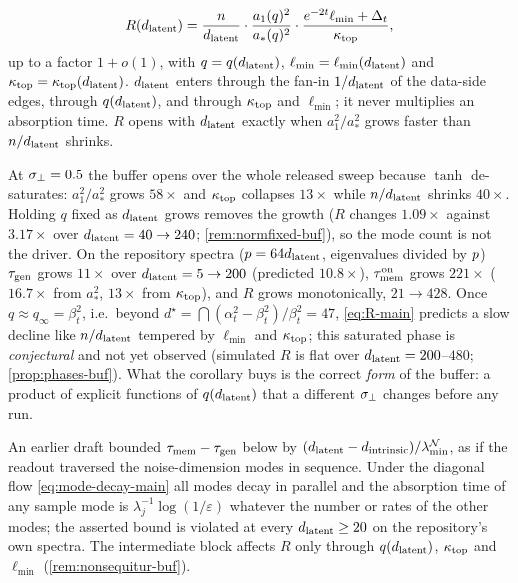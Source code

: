 \begin{corollary}\label{cor:buffer-main}
\begin{equation}\label{eq:R-main}
R(d_{\mathrm{latent}})=\frac{n}{d_{\mathrm{latent}}}\cdot\frac{a_1(q)^2}{a_*(q)^2}\cdot\frac{e^{-2t}\ell_{\min}+\Delta_t}{\kappa_{\rm top}},
\end{equation}
up to a factor $1+o(1)$, with $q=q(d_{\mathrm{latent}})$, $\ell_{\min}=\ell_{\min}(d_{\mathrm{latent}})$ and $\kappa_{\rm top}=\kappa_{\rm top}(d_{\mathrm{latent}})$. $d_{\mathrm{latent}}$ enters through the fan-in $1/d_{\mathrm{latent}}$ of the data-side edges, through $q(d_{\mathrm{latent}})$, and through $\kappa_{\rm top}$ and $\ell_{\min}$; it never multiplies an absorption time. $R$ opens with $d_{\mathrm{latent}}$ exactly when $a_1^2/a_*^2$ grows faster than $n/d_{\mathrm{latent}}$ shrinks.
\end{corollary}
At $\sigma_{\perp}=0.5$ the buffer opens over the whole released sweep because $\tanh$ de-saturates: $a_1^2/a_*^2$ grows $58\times$ and $\kappa_{\rm top}$ collapses $13\times$ while $n/d_{\mathrm{latent}}$ shrinks $40\times$. Holding $q$ fixed as $d_{\mathrm{latent}}$ grows removes the growth ($R$ changes $1.09\times$ against $3.17\times$ over $d_{\mathrm{latent}}=40\to240$; \cref{rem:normfixed-buf}), so the mode count is not the driver. On the repository spectra ($p=64d_{\mathrm{latent}}$, eigenvalues divided by $p$) $\tau_{\mathrm{gen}}$ grows $11\times$ over $d_{\mathrm{latent}}=5\to200$ (predicted $10.8\times$), $\tau_{\mathrm{mem}}^{\rm on}$ grows $221\times$ ($16.7\times$ from $a_*^2$, $13\times$ from $\kappa_{\rm top}$), and $R$ grows monotonically, $21\to428$. Once $q\approx q_\infty=\beta_t^2$, i.e.\ beyond $d^\star=\dint(\alpha_t^2-\beta_t^2)/\beta_t^2=47$, \eqref{eq:R-main} predicts a slow decline like $n/d_{\mathrm{latent}}$ tempered by $\ell_{\min}$ and $\kappa_{\rm top}$; this saturated phase is \emph{conjectural} and not yet observed (simulated $R$ is flat over $d_{\mathrm{latent}}=200$--$480$; \cref{prop:phases-buf}). What the corollary buys is the correct \emph{form} of the buffer: a product of explicit functions of $q(d_{\mathrm{latent}})$ that a different $\sigma_{\perp}$ changes before any run.

\begin{remark}\label{rem:nonsequitur-main}
An earlier draft bounded $\tau_{\mathrm{mem}}-\tau_{\mathrm{gen}}$ below by $(d_{\mathrm{latent}}-d_{\mathrm{intrinsic}})/\lambda^{\mathcal N}_{\min}$, as if the readout traversed the noise-dimension modes in sequence. Under the diagonal flow \eqref{eq:mode-decay-main} all modes decay in parallel and the absorption time of any sample mode is $\lambda_j^{-1}\log(1/\varepsilon)$ whatever the number or rates of the other modes; the asserted bound is violated at every $d_{\mathrm{latent}}\ge20$ on the repository's own spectra. The intermediate block affects $R$ only through $q(d_{\mathrm{latent}})$, $\kappa_{\rm top}$ and $\ell_{\min}$ (\cref{rem:nonsequitur-buf}).
\end{remark}

